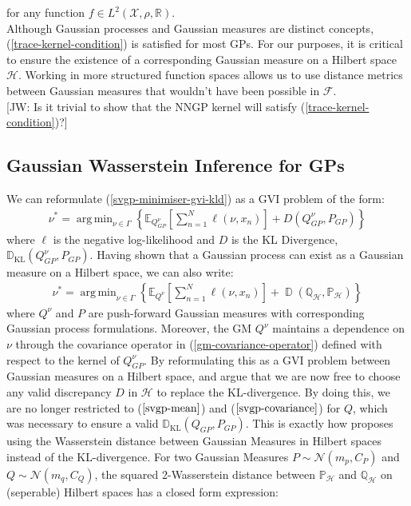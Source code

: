 \documentclass{article}
\newcommand{\jw}[1]{{\color{gray} [JW: #1]}}
\newcommand{\KLD}{\operatorname{\mathbb{D}_{KL}}}
\newcommand{\D}{\operatorname{\mathbb{D}}}
\DeclareMathOperator*{\argmin}{arg\,min}
\numberwithin{equation}{section}
\begin{document}
for any function $f \in L^2(\mathcal{X}, \rho, \mathbb{R})$. \\
\newline
Although Gaussian processes and Gaussian measures are distinct concepts, (\ref{trace-kernel-condition}) is satisfied for most GPs. For our purposes, it is critical to ensure the existence of a corresponding Gaussian measure on a Hilbert space $\mathcal{H}$. Working in more structured function spaces allows us to use distance metrics between Gaussian measures that wouldn't have been possible in $\mathcal{F}$.
\\\jw{Is it trivial to show that the NNGP kernel will satisfy (\ref{trace-kernel-condition})?}

\subsection{Gaussian Wasserstein Inference for GPs}
We can reformulate (\ref{svgp-minimiser-gvi-kld}) as a GVI problem of the form:
\begin{align}
    \label{svgp-gwi-gp}
    \nu^* = \argmin_{\nu \in \Gamma} \left\{ \mathbb{E}_{Q_{GP}^{\nu}}\left[\sum_{n=1}^N \ell(\nu, x_n)\right] + D(Q_{GP}^{\nu}, P_{GP})\right\}
\end{align}
where $\ell$ is the negative log-likelihood and $D$ is the KL Divergence, $\KLD(Q_{GP}^{\nu}, P_{GP})$. Having shown that a Gaussian process can exist as a Gaussian measure on a Hilbert space, we can also write:
\begin{align}
    \label{svgp-gwi-gm}
    \nu^* = \argmin_{\nu \in \Gamma} \left\{ \mathbb{E}_{Q^{\nu}}\left[\sum_{n=1}^N \ell(\nu, x_n)\right] + \D(\mathbb{Q}_{\mathcal{H}}, \mathbb{P}_{\mathcal{H}})\right\}
\end{align}
where $Q^{\nu}$ and $P$ are push-forward Gaussian measures with corresponding Gaussian process formulations. Moreover, the GM $Q^{\nu}$ maintains a dependence on $\nu$ through the covariance operator in (\ref{gm-covariance-operator}) defined with respect to the kernel of $Q_{GP}^{\nu}$. By reformulating this as a GVI problem between Gaussian measures on a Hilbert space, \cite{wild2022generalized} and \cite{knoblauch2022optimization} argue that we are now free to choose any valid discrepancy $D$ in $\mathcal{H}$ to replace the KL-divergence. By doing this, we are no longer restricted to ($\ref{svgp-mean}$) and ($\ref{svgp-covariance}$) for $Q$, which was necessary to ensure a valid $\KLD(Q_{GP},  P_{GP})$. This is exactly how \cite{wild2022generalized} proposes using the Wasserstein distance between Gaussian Measures in Hilbert spaces instead of the KL-divergence. For two Gaussian Measures $P \sim \mathcal{N}(m_p, C_P)$ and $Q \sim \mathcal{N}(m_q, C_Q)$, the squared 2-Wasserstein distance between $\mathbb{P}_{\mathcal{H}}$ and $\mathbb{Q}_{\mathcal{H}}$ on (seperable) Hilbert spaces has a closed form expression:
\end{document}
